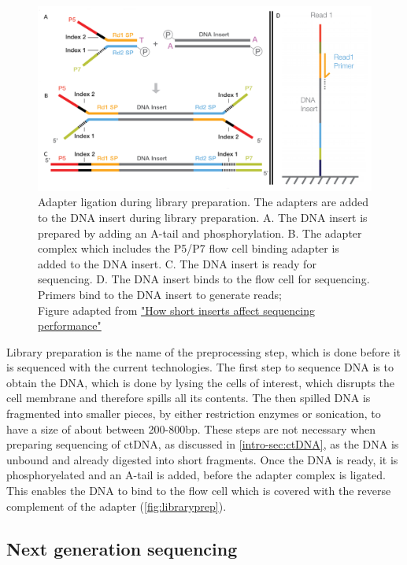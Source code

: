 \begin{figure}[htp]
\centering
\includegraphics[width=.9\linewidth]{Figures/intro/LibraryPreparation.png}
\caption[Library preparation for NGS]{Adapter ligation during library preparation. The adapters are added to the DNA insert during library preparation. A. The DNA insert is prepared by adding an A-tail and phosphorylation. B. The adapter complex which includes the P5/P7 flow cell binding adapter is added to the DNA insert. C. The DNA insert is ready for sequencing. D. The DNA insert binds to the flow cell for sequencing. Primers bind to the DNA insert to generate reads; \\Figure adapted from \href{https://sapac.support.illumina.com/bulletins/2020/12/how-short-inserts-affect-sequencing-performance.html}{"How short inserts affect sequencing performance"}\protect\cite{Illumina2020}}\label{fig:libraryprep}
\end{figure}

Library preparation is the name of the preprocessing step, which is done before it is sequenced with the current technologies. The first step to sequence DNA is to obtain the DNA, which is done by lysing the cells of interest, which disrupts the cell membrane and therefore spills all its contents. The then spilled DNA is fragmented into smaller pieces, by either restriction enzymes or sonication, to have a size of about between 200-800bp. These steps are not necessary when preparing sequencing of ctDNA, as discussed in \autoref{intro-sec:ctDNA}, as the DNA is unbound and already digested into short fragments.
Once the DNA is ready, it is phosphoryelated and an A-tail is added, before the adapter complex is ligated. This enables the DNA to bind to the flow cell which is covered with the reverse complement of the adapter (\autoref{fig:libraryprep}). 

\subsection{Next generation sequencing}
\label{intro-sec:ngs}

